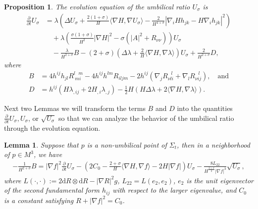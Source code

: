 \documentclass[12pt,a4paper]{amsart}
\newtheorem{Lma}{Lemma}
\newtheorem{Prop}{Proposition}
\begin{document}
\begin{Prop} \label{prop2}
The evolution equation of the umbilical ratio $U_\sigma$ is
\begin{align*}
\frac{\partial}{\partial t} U_\sigma
&=\lambda\left(\Delta U_{\sigma}+\frac{2(1+\sigma)}{H}\langle \nabla H, \nabla U_{\sigma}\rangle
 -\frac{2}{H^{4+\sigma}}|\nabla_iHh_{jk}-H\nabla_ih_{jk}|^2\right)\\
&\quad+\lambda\left(\frac{\sigma(1+\sigma)}{H^2}|\nabla H|^2-\sigma(|A|^2+R_{\nu\nu})\right)U_{\sigma} \\
&\quad-\frac{\lambda}{H^{2+\sigma}}B-(2+\sigma)\left(\Delta\lambda+\frac{2}{H}\langle\nabla H,\nabla\lambda\rangle\right)U_{\sigma}+\frac{2}{H^{2+\sigma}}D,
\end{align*}
where
\begin{align*}
B&=4h^{ij}h_{jl}R_{\ mi\ }^{l\ \ \ m}-4 h^{ij}h^{lm}R_{iljm}-2h^{ij}(\nabla_j R_{\nu li}^{\ \ \ l}+\nabla_l R_{\nu ij}^{\ \ \ l}),\quad\mbox{and} \\
D&=h^{ij}\left(H\lambda_{,ij}+2H_{,i}\lambda_{,j}\right)-\frac{1}{2}H(H\Delta\lambda+2\langle\nabla H,\nabla\lambda\rangle).
\end{align*}
\end{Prop}

Next two Lemmas we will transform the terms $B$ and $D$ into the quantities $\frac{\partial}{\partial t}U_{\sigma},U_{\sigma}$, or $\sqrt{U_{\sigma}}$
so that we can analyze the behavior of the umbilical ratio through the evolution equation.

\begin{Lma} \label{B}
Suppose that $p$ is a non-umbilical point of $\Sigma_t$, then in a neighborhood of $p\in M^3$, we have
\begin{align*}
-\frac{1}{H^{2+\sigma}}B
=|\nabla f|^2\frac{\partial}{\partial t}U_{\sigma}
-\left(2C_0-\frac{2+\sigma}{H}\langle\nabla H,\nabla f\rangle-2H|\nabla f|\right)U_{\sigma}
-\frac{8L_{22}}{H^{\frac{2+\sigma}{2}}|\nabla f|^{3}}\sqrt{U_\sigma},
\end{align*}
where $L(\cdot,\cdot):=2\mathrm{d}R\otimes\mathrm{d}R-|\nabla R|^2g$,
$L_{22}=L(e_2,e_2)$,
$e_2$ is the unit eigenvector of the second fundamental form $h_{ij}$
with respect to the larger eigenvalue,
and $C_0$ is a constant satisfying $R+|\nabla f|^2=C_0$.
\end{Lma}
\end{document}
